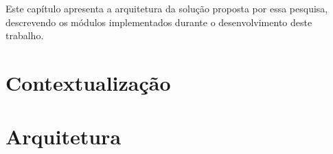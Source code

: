 Este capítulo apresenta a arquitetura da solução proposta por essa pesquisa, descrevendo os módulos implementados durante o desenvolvimento deste trabalho.

\section{Contextualização}


\section{Arquitetura}


